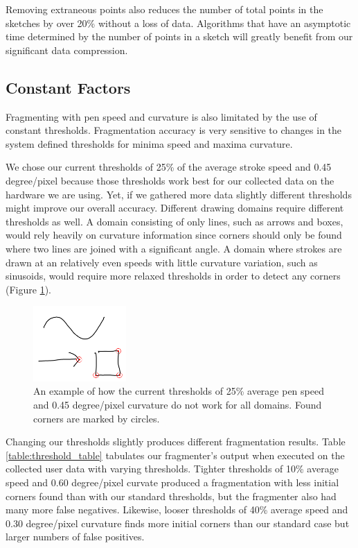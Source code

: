 \documentclass[10pt]{acmsiggraph}          %
\begin{document}
Removing extraneous points also reduces the number of total points in the sketches by over 20\% without a loss of data. Algorithms that have an asymptotic time determined by
the number of points in a sketch will greatly benefit from our significant data compression.


\subsection{Constant Factors}

Fragmenting with pen speed and curvature is also limitated by the use of constant thresholds. Fragmentation accuracy is very sensitive to changes in the system defined thresholds for minima speed and maxima curvature. 

We chose our current thresholds of 25\% of the average stroke speed and 0.45 degree/pixel because those thresholds work best for our collected data on the hardware we are using. Yet, if we gathered more data slightly different thresholds might improve our overall accuracy. Different drawing domains require different thresholds as well. A domain consisting of only lines, such as arrows and boxes, would rely heavily on curvature information since corners should only be found where two lines are joined with a significant angle. A domain where strokes are drawn at an relatively even speeds with little curvature variation, such as sinusoids, would require more relaxed thresholds in order to detect any corners (Figure \ref{fig:domain_example}).

\begin{figure}[b]
  \centering
  \includegraphics[width=1.4in]{curve_arrow.png}
  \caption{An example of how the current thresholds of 25\% average pen speed and 0.45 degree/pixel curvature do not work for all domains.
  Found corners are marked by circles.}
  \label{fig:domain_example}
\end{figure}

Changing our thresholds slightly produces different fragmentation results. Table \ref{table:threshold_table} tabulates our fragmenter's output when executed on the collected user
data with varying thresholds. Tighter thresholds of 10\% average speed and 0.60 degree/pixel curvate produced a fragmentation with less initial corners found than with our standard thresholds, but the fragmenter also had many more false negatives. Likewise, looser thresholds of 40\% average speed and 0.30 degree/pixel curvature finds more initial corners than our standard case but larger numbers of false positives.
\end{document}

